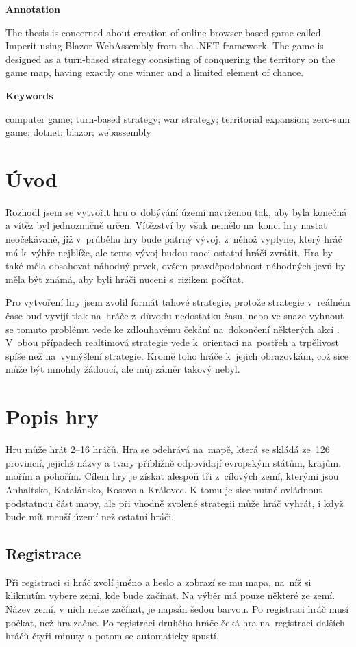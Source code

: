 \documentclass[a4paper,12pt]{article}
\begin{document}
\Large\textbf{Annotation}\normalsize

The thesis is concerned about creation of online browser-based game called Imperit using Blazor WebAssembly from the .NET framework. The game is designed as a turn-based strategy consisting of conquering the territory on the game map, having exactly one winner and a limited element of chance.

\Large\textbf{Keywords}\normalsize

computer game; turn-based strategy; war strategy; territorial expansion; zero-sum game;\- dotnet; blazor; webassembly
\newpage
\thispagestyle{empty}
\tableofcontents
\newpage
\section{Úvod}
Rozhodl jsem se vytvořit hru o~dobývání území navrženou tak, aby byla konečná a vítěz byl jednoznačně určen. Vítězství by však nemělo na~konci hry nastat neočekávaně, již v~průběhu hry bude patrný vývoj, z~něhož vyplyne, který hráč má k~výhře nejblíže, ale tento vývoj budou moci ostatní hráči zvrátit. Hra by také měla obsahovat náhodný prvek, ovšem pravděpodobnost náhodných jevů by měla být známá, aby byli hráči nuceni s~rizikem počítat.

Pro vytvoření hry jsem zvolil formát tahové strategie, protože strategie v~reálném čase buď vyvíjí tlak na~hráče z~důvodu nedostatku času, nebo ve snaze vyhnout se tomuto problému vede ke zdlouhavému čekání na~dokončení některých akcí \cite{turnreal1}. V~obou případech realtimová strategie vede k~orientaci na~postřeh a trpělivost spíše než na~vymýšlení strategie\cite{turnreal2}. Kromě toho  hráče k~jejich obrazovkám, což sice může být mnohdy žádoucí, ale můj záměr takový nebyl.

\section{Popis hry}
Hru může hrát 2--16 hráčů. Hra se odehrává na~mapě, která se skládá ze~126 provincií, jejichž názvy a tvary přibližně odpovídají evropským státům, krajům, mořím a pohořím. Cílem hry je získat alespoň tři z~cílových zemí, kterými jsou Anhaltsko, Katalánsko, Kosovo a Královec. K tomu je sice nutné ovládnout podstatnou část mapy, ale při vhodně zvolené strategii může hráč vyhrát, i když bude mít menší území než ostatní hráči.
\subsection{Registrace}
Při registraci si hráč zvolí jméno a heslo a zobrazí se mu mapa, na~níž si kliknutím vybere zemi, kde bude začínat. Na výběr má pouze některé ze zemí. Název zemí, v nich nelze začínat, je napsán šedou barvou. Po registraci hráč musí počkat, než hra začne. Po registraci druhého hráče čeká hra na~registraci dalších hráčů čtyři minuty a potom se automaticky spustí.
\end{document}
